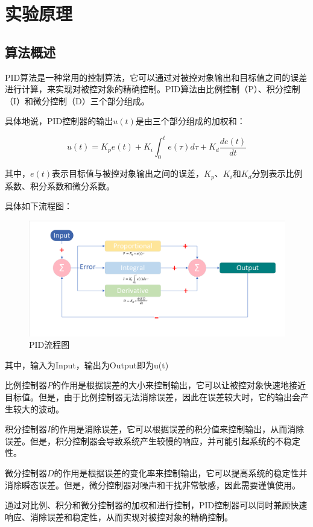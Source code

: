 \documentclass{xjtureport}
\begin{document}
\section{实验原理}
\subsection{算法概述}
PID算法是一种常用的控制算法，它可以通过对被控对象输出和目标值之间的误差进行计算，来实现对被控对象的精确控制。PID算法由比例控制（P）、积分控制（I）和微分控制（D）三个部分组成。

具体地说，PID控制器的输出$u(t)$是由三个部分组成的加权和：

$$u(t) = K_{p}e(t) + K_{i}\int_{0}^{t}e(\tau)d\tau + K_{d}\frac{de(t)}{dt}$$

其中，$e(t)$表示目标值与被控对象输出之间的误差，$K_p$、$K_i$和$K_d$分别表示比例系数、积分系数和微分系数。

具体如下流程图：
\begin{figure}[H]
    \centering
    \includegraphics[width=18cm]{figures/PID流程图.pdf}
    \caption{PID流程图}
    \label{fig:PID流程图}
\end{figure}
其中，输入为Input，输出为Output即为u(t)

比例控制器$P$的作用是根据误差的大小来控制输出，它可以让被控对象快速地接近目标值。但是，由于比例控制器无法消除误差，因此在误差较大时，它的输出会产生较大的波动。

积分控制器$I$的作用是消除误差，它可以根据误差的积分值来控制输出，从而消除误差。但是，积分控制器会导致系统产生较慢的响应，并可能引起系统的不稳定性。

微分控制器$D$的作用是根据误差的变化率来控制输出，它可以提高系统的稳定性并消除瞬态误差。但是，微分控制器对噪声和干扰非常敏感，因此需要谨慎使用。

通过对比例、积分和微分控制器的加权和进行控制，PID控制器可以同时兼顾快速响应、消除误差和稳定性，从而实现对被控对象的精确控制。
\end{document}
